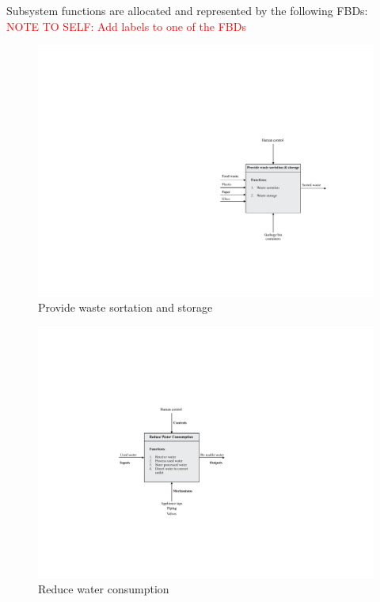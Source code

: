 \documentclass[a4paper,11pt,fleqn]{report}
\begin{document}
Subsystem functions are allocated and represented by the following \ac{FBD}s:\\ \textcolor{red}{NOTE TO SELF: Add labels to one of the FBDs}
%
\begin{figure}[h!]
\begin{center}
\includegraphics[scale = 0.8]{Function1.pdf}
\caption{Provide waste sortation and storage}
\label{fig: Function1}
\end{center}
\end{figure}
%
\begin{figure}[h!]
\begin{center}
\includegraphics[scale = 0.8]{Function2.pdf}
\caption{Reduce water consumption}
\label{fig: Function2}
\end{center}
\end{figure}
\end{document}
